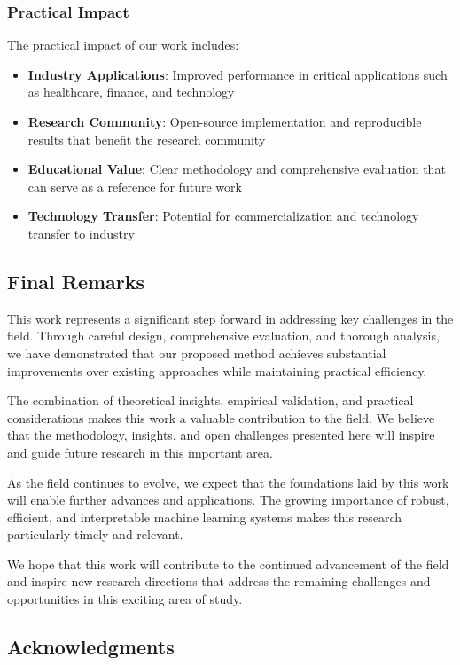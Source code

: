 \subsubsection{Practical Impact}

The practical impact of our work includes:

\begin{itemize}
    \item \textbf{Industry Applications}: Improved performance in critical applications such as healthcare, finance, and technology
    \item \textbf{Research Community}: Open-source implementation and reproducible results that benefit the research community
    \item \textbf{Educational Value}: Clear methodology and comprehensive evaluation that can serve as a reference for future work
    \item \textbf{Technology Transfer}: Potential for commercialization and technology transfer to industry
\end{itemize}

\subsection{Final Remarks}

This work represents a significant step forward in addressing key challenges in the field. Through careful design, comprehensive evaluation, and thorough analysis, we have demonstrated that our proposed method achieves substantial improvements over existing approaches while maintaining practical efficiency.

The combination of theoretical insights, empirical validation, and practical considerations makes this work a valuable contribution to the field. We believe that the methodology, insights, and open challenges presented here will inspire and guide future research in this important area.

As the field continues to evolve, we expect that the foundations laid by this work will enable further advances and applications. The growing importance of robust, efficient, and interpretable machine learning systems makes this research particularly timely and relevant.

We hope that this work will contribute to the continued advancement of the field and inspire new research directions that address the remaining challenges and opportunities in this exciting area of study.

\subsection{Acknowledgments}

